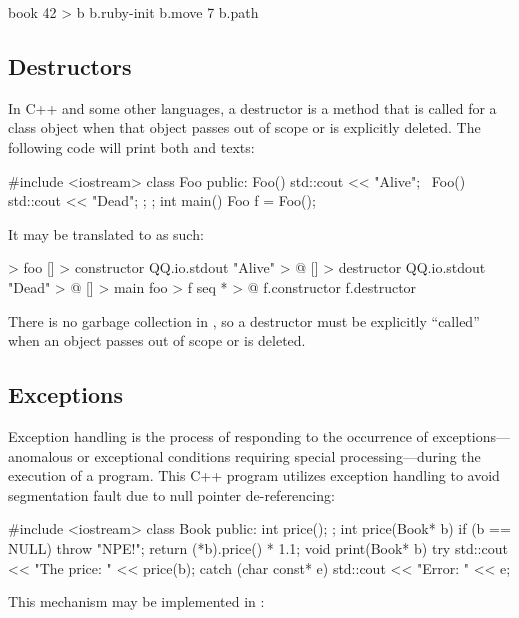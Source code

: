 \documentclass[sigplan,nonacm]{acmart}
\begin{document}
\begin{ffcode}
book 42 > b
b.ruby-init
b.move 7
b.path
\end{ffcode}

\subsection{Destructors}
\label{sec:destructors}

In C++ and some other languages, a destructor is a method that is called for a class object when that object passes out of scope or is explicitly deleted. The following code will print both  and  texts:

\begin{ffcode}
#include <iostream>
class Foo {
public:
  Foo() { std::cout << "Alive"; }
  ~Foo() { std::cout << "Dead"; };
};
int main() {
  Foo f = Foo();
}
\end{ffcode}

It may be translated to \eolang{} as such:

\begin{ffcode}
[] > foo
  [] > constructor
    QQ.io.stdout "Alive" > @
  [] > destructor
    QQ.io.stdout "Dead" > @
[] > main
  foo > f
  seq * > @
    f.constructor
    f.destructor
\end{ffcode}

There is no garbage collection in \eolang{}, so a destructor must be explicitly ``called'' when an object passes out of scope or is deleted.

\subsection{Exceptions}
\label{sec:exceptions}

Exception handling is the process of responding to the occurrence of exceptions—anomalous or exceptional conditions requiring special processing—during the execution of a program. This C++ program utilizes exception handling to avoid segmentation fault due to null pointer de-referencing:

\begin{ffcode}
#include <iostream>
class Book { public: int price(); };
int price(Book* b) {
  if (b == NULL) throw "NPE!";
  return (*b).price() * 1.1;
}
void print(Book* b) {
  try {
    std::cout << "The price: " << price(b);
  } catch (char const* e) {
    std::cout << "Error: " << e;
  }
}
\end{ffcode}

This mechanism may be implemented in \eolang{}:
\end{document}
